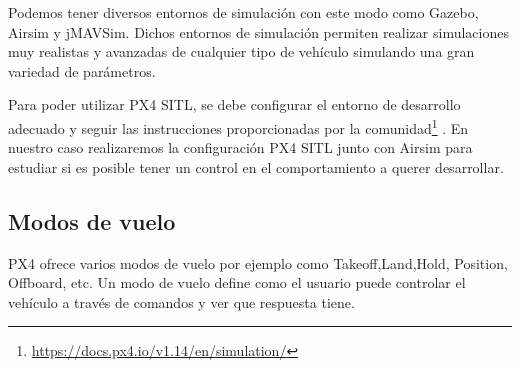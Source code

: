 Podemos tener diversos entornos de simulación con este modo como Gazebo, Airsim y jMAVSim. Dichos entornos de simulación permiten realizar simulaciones muy realistas y avanzadas 
de cualquier tipo de vehículo simulando una gran variedad de parámetros.\newline

Para poder utilizar PX4 SITL, se debe configurar el entorno de desarrollo adecuado y seguir las instrucciones proporcionadas por la comunidad\footnote{\url{https://docs.px4.io/v1.14/en/simulation/}} .
En nuestro caso realizaremos la configuración PX4 SITL junto con Airsim para estudiar si es posible tener un control en el comportamiento a querer
desarrollar. 

\subsection{Modos de vuelo}
\label{sec:flight modes} 

PX4 ofrece varios modos de vuelo por ejemplo como Takeoff,Land,Hold, Position, Offboard, etc. Un modo de vuelo define como el usuario puede controlar el vehículo a través de comandos
  y ver que respuesta tiene. 


